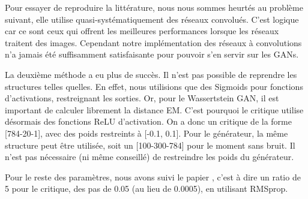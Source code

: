  	Pour essayer de reproduire la littérature, nous nous sommes heurtés au problème suivant, elle utilise quasi-systématiquement des réseaux convolués. C'est logique car ce sont ceux qui offrent les meilleures performances lorsque les réseaux traitent des images. Cependant notre implémentation des réseaux à convolutions n'a jamais été suffisamment satisfaisante pour pouvoir s'en servir sur les GANs.

 	La deuxième méthode a eu plus de succès. Il n'est pas possible de reprendre les structures telles quelles. En effet, nous utilisions que des Sigmoids pour fonctions d'activations, restreignant les sorties. Or, pour le Wassertstein GAN, il est important de calculer librement la distance EM. C'est pourquoi le critique utilise désormais des fonctions ReLU d'activation. On a donc un critique de la forme [784-20-1], avec des poids restreints à [-0.1, 0.1]. Pour le générateur, la même structure peut être utilisée, soit un [100-300-784] pour le moment sans bruit. Il n'est pas nécessaire (ni même conseillé) de restreindre les poids du générateur.

 	Pour le reste des paramètres, nous avons suivi le papier \cite{arjovsky_wasserstein_2017}, c'est à dire un ratio de 5 pour le critique, des pas de 0.05 (au lieu de 0.0005), en utilisant RMSprop.

